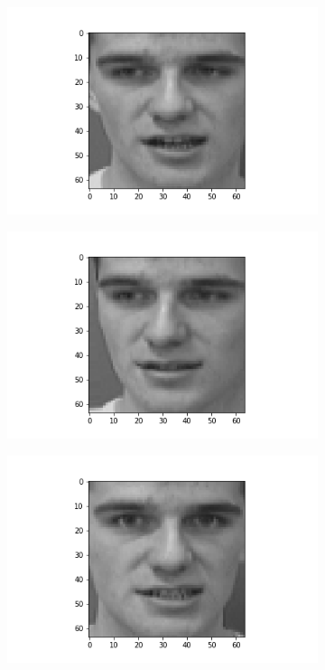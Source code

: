 \documentclass[12pt, a4paper]{article}
\begin{document}
\begin{figure}[h]
\begin{subfigure}{0.3\linewidth}
    \end{subfigure}
    \newline
    \begin{subfigure}{0.3\linewidth}
        \centering
        \includegraphics[width=\linewidth]{images/q3/c/5/6.png}
    \end{subfigure}
    \hfill
    \begin{subfigure}{0.3\linewidth}
        \centering
        \includegraphics[width=\linewidth]{images/q3/c/5/7.png}
    \end{subfigure}
    \hfill
    \begin{subfigure}{0.3\linewidth}
        \centering
        \includegraphics[width=\linewidth]{images/q3/c/5/8.png}

\end{subfigure}
\end{figure}
\end{document}
